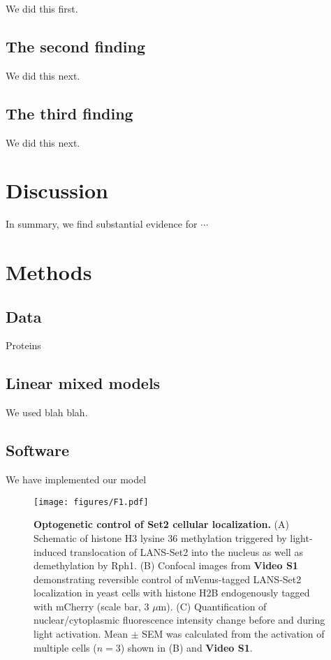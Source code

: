 \documentclass[12pt]{biorxiv}
\begin{document}
\begin{spacing}{2}
We did this first.


\subsection*{The second finding}

We did this next.


\subsection*{The third finding}

We did this next.



\section*{Discussion}

In summary, we find substantial evidence for $\cdots$



\section*{Methods}

\subsection*{Data}

Proteins


\subsection*{Linear mixed models}

We used blah blah.


\subsection*{Software}
We have implemented our model 




%
%
%
%

\begin{figure}
\center
\texttt{[image: figures/F1.pdf]}
\caption{\textbf{Optogenetic control of Set2 cellular localization.} (A) Schematic of histone H3 lysine 36 methylation triggered by light-induced translocation of LANS-Set2 into the nucleus as well as demethylation by Rph1. (B) Confocal images from \textbf{Video S1} demonstrating reversible control of mVenus-tagged LANS-Set2 localization in yeast cells with histone H2B endogenously tagged with mCherry (scale bar, 3 $\mu$m). (C) Quantification of nuclear/cytoplasmic fluorescence intensity change before and during light activation. Mean $\pm$ SEM was calculated from the activation of multiple cells ($n = 3$) shown in (B) and \textbf{Video S1}.}
\end{figure}


\end{spacing}
\end{document}

